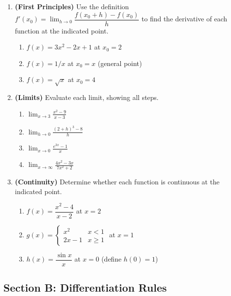 \documentclass[12pt, a4paper]{article}
\theoremstyle{definition}
\begin{document}
\begin{enumerate}[label=\textbf{A\arabic*.}, leftmargin=2.5em]

\item \textbf{(First Principles)}
Use the definition $f'(x_0) = \lim_{h\to 0}\dfrac{f(x_0+h)-f(x_0)}{h}$
to find the derivative of each function at the indicated point.
\begin{enumerate}[label=(\alph*)]
  \item $f(x) = 3x^2 - 2x + 1$ at $x_0 = 2$
  \item $f(x) = 1/x$ at $x_0 = x$ (general point)
  \item $f(x) = \sqrt{x}$ at $x_0 = 4$
\end{enumerate}

\item \textbf{(Limits)}
Evaluate each limit, showing all steps.
\begin{enumerate}[label=(\alph*)]
  \item $\displaystyle\lim_{x\to 3}\frac{x^2-9}{x-3}$
  \item $\displaystyle\lim_{h\to 0}\frac{(2+h)^3-8}{h}$
  \item $\displaystyle\lim_{x\to 0}\frac{e^{3x}-1}{x}$
  \item $\displaystyle\lim_{x\to\infty}\frac{4x^2-3x}{7x^2+2}$
\end{enumerate}

\item \textbf{(Continuity)}
Determine whether each function is continuous at the indicated point.
\begin{enumerate}[label=(\alph*)]
  \item $f(x) = \dfrac{x^2-4}{x-2}$ at $x=2$
  \item $g(x) = \begin{cases} x^2 & x < 1 \\ 2x-1 & x \geq 1 \end{cases}$
        at $x=1$
  \item $h(x) = \dfrac{\sin x}{x}$ at $x = 0$ (define $h(0)=1$)
\end{enumerate}

\end{enumerate}

\subsection{Section B: Differentiation Rules}
\end{document}
